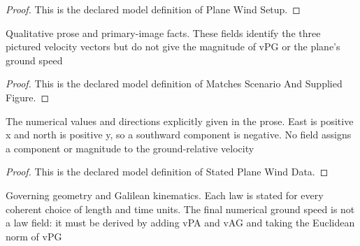 \begin{proof}
  This is the declared model definition of Plane Wind Setup.
\end{proof}
\begin{definition}
  \label{def:physics:phyx-mini-0828:phyxminiproblems-problemphyxmini0828-matchesscenarioandsuppliedfigure}
  Qualitative prose and primary-image facts. These fields identify the three pictured velocity vectors but do not give the magnitude of vPG or the plane's ground speed
\end{definition}
\begin{proof}
  This is the declared model definition of Matches Scenario And Supplied Figure.
\end{proof}
\begin{definition}
  \label{def:physics:phyx-mini-0828:phyxminiproblems-problemphyxmini0828-statedplanewinddata}
  The numerical values and directions explicitly given in the prose. East is positive x and north is positive y, so a southward component is negative. No field assigns a component or magnitude to the ground-relative velocity
\end{definition}
\begin{proof}
  This is the declared model definition of Stated Plane Wind Data.
\end{proof}
\begin{definition}
  \label{def:physics:phyx-mini-0828:phyxminiproblems-problemphyxmini0828-planewindkinematicslaws}
  Governing geometry and Galilean kinematics. Each law is stated for every coherent choice of length and time units. The final numerical ground speed is not a law field: it must be derived by adding vPA and vAG and taking the Euclidean norm of vPG
\end{definition}
